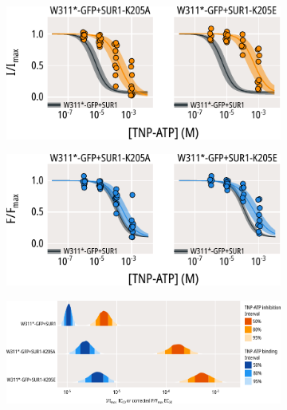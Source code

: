 \begin{figure}[hbtp]
\begin{subfigure}[t]{0.45\textwidth}
	\end{subfigure}
	\vfill
	\begin{subfigure}[t]{0.45\textwidth}
		\caption{}\label{ch6fig:k205_3}
		\centering
		\includegraphics[width=\textwidth]{k205_3.pdf}
	\end{subfigure}
	\hfill
	\begin{subfigure}[t]{0.45\textwidth}
		\caption{}\label{ch6fig:k205_4}
		\centering
		\includegraphics[width=\textwidth]{k205_4.pdf}
	\end{subfigure}
	\vfill
	\begin{subfigure}[t]{0.9\textwidth}
		\caption{}\label{ch6fig:k205_5}
		\centering
		\includegraphics[width=\textwidth]{k205_5.pdf}
	\end{subfigure}
	\caption[Functional effects of mutations at K205]{
	{\bf{}}
}
\end{figure}
